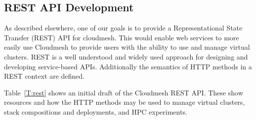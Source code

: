 \documentclass[9pt,twocolumn,twoside]{styles/osajnl}
\begin{document}
\subsection{REST API Development}

As described elsewhere, one of our goals is to provide a
Representational State Transfer (REST) API for cloudmesh. This would
enable web services to more easily use Cloudmesh to provide users with
the ability to use and manage virtual clusters.  REST is a well
understood and widely used approach for designing and developing
service-based APIs. Additionally the semantics of HTTP methods in a
REST context are defined.


Table~\ref{T:rest} shows an initial draft of the Cloudmesh REST
API. These show resources and how the HTTP methods may be used to
manage virtual clusters, stack compositions and deployments, and HPC
experiments.
\end{document}
